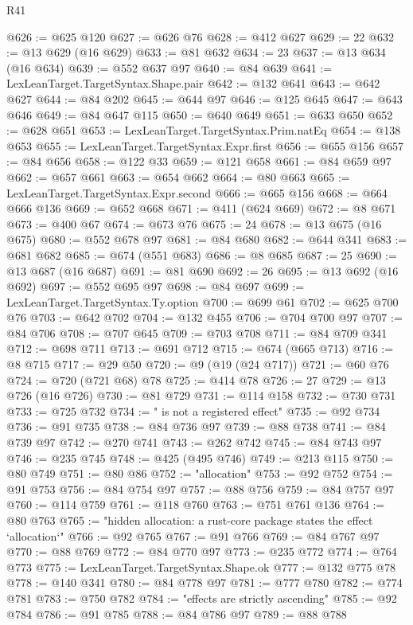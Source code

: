 \begin{lexlean}{R41}
\begin{coremodule}
@626 := @625 @120
@627 := @626 @76
@628 := @412 @627
@629 := 22
@632 := @13 @629 (@16 @629)
@633 := @81 @632
@634 := 23
@637 := @13 @634 (@16 @634)
@639 := @552 @637 @97
@640 := @84 @639
@641 := LexLeanTarget.TargetSyntax.Shape.pair
@642 := @132 @641
@643 := @642 @627
@644 := @84 @202
@645 := @644 @97
@646 := @125 @645
@647 := @643 @646
@649 := @84 @647 @115
@650 := @640 @649
@651 := @633 @650
@652 := @628 @651
@653 := LexLeanTarget.TargetSyntax.Prim.natEq
@654 := @138 @653
@655 := LexLeanTarget.TargetSyntax.Expr.first
@656 := @655 @156
@657 := @84 @656
@658 := @122 @33
@659 := @121 @658
@661 := @84 @659 @97
@662 := @657 @661
@663 := @654 @662
@664 := @80 @663
@665 := LexLeanTarget.TargetSyntax.Expr.second
@666 := @665 @156
@668 := @664 @666 @136
@669 := @652 @668
@671 := @411 (@624 @669)
@672 := @8 @671
@673 := @400 @67
@674 := @673 @76
@675 := 24
@678 := @13 @675 (@16 @675)
@680 := @552 @678 @97
@681 := @84 @680
@682 := @644 @341
@683 := @681 @682
@685 := @674 (@551 @683)
@686 := @8 @685
@687 := 25
@690 := @13 @687 (@16 @687)
@691 := @81 @690
@692 := 26
@695 := @13 @692 (@16 @692)
@697 := @552 @695 @97
@698 := @84 @697
@699 := LexLeanTarget.TargetSyntax.Ty.option
@700 := @699 @61
@702 := @625 @700 @76
@703 := @642 @702
@704 := @132 @455
@706 := @704 @700 @97
@707 := @84 @706
@708 := @707 @645
@709 := @703 @708
@711 := @84 @709 @341
@712 := @698 @711
@713 := @691 @712
@715 := @674 (@665 @713)
@716 := @8 @715
@717 := @29 @50
@720 := @9 (@19 (@24 @717))
@721 := @60 @76
@724 := @720 (@721 @68) @78
@725 := @414 @78
@726 := 27
@729 := @13 @726 (@16 @726)
@730 := @81 @729
@731 := @114 @158
@732 := @730 @731
@733 := @725 @732
@734 := " is not a registered effect"
@735 := @92 @734
@736 := @91 @735
@738 := @84 @736 @97
@739 := @88 @738
@741 := @84 @739 @97
@742 := @270 @741
@743 := @262 @742
@745 := @84 @743 @97
@746 := @235 @745
@748 := @425 (@495 @746)
@749 := @213 @115
@750 := @80 @749
@751 := @80 @86
@752 := "allocation"
@753 := @92 @752
@754 := @91 @753
@756 := @84 @754 @97
@757 := @88 @756
@759 := @84 @757 @97
@760 := @114 @759
@761 := @118 @760
@763 := @751 @761 @136
@764 := @80 @763
@765 := "hidden allocation: a rust-core package states the effect `allocation`"
@766 := @92 @765
@767 := @91 @766
@769 := @84 @767 @97
@770 := @88 @769
@772 := @84 @770 @97
@773 := @235 @772
@774 := @764 @773
@775 := LexLeanTarget.TargetSyntax.Shape.ok
@777 := @132 @775 @78
@778 := @140 @341
@780 := @84 @778 @97
@781 := @777 @780
@782 := @774 @781
@783 := @750 @782
@784 := "effects are strictly ascending"
@785 := @92 @784
@786 := @91 @785
@788 := @84 @786 @97
@789 := @88 @788

\end{coremodule}
\end{lexlean}
